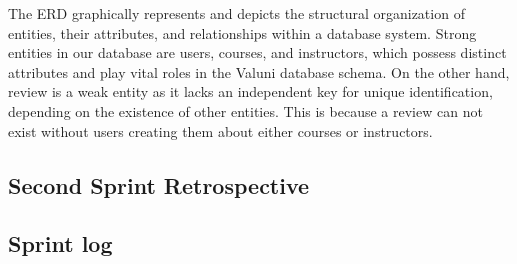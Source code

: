\documentclass{article}
\begin{document}
\quad The ERD graphically represents and depicts the structural organization of entities, their attributes, and relationships within a database system. Strong entities in our database are users, courses, and instructors, which possess distinct attributes and play vital roles in the Valuni database schema. On the other hand, review is a weak entity as it lacks an independent key for unique identification, depending on the existence of other entities. This is because a review can not exist without users creating them about either courses or instructors. 
\break 

\begin{landscape}

\section{Second Sprint Retrospective} 

\subsection{Sprint log} 
\scriptsize


\end{landscape}
\end{document}
